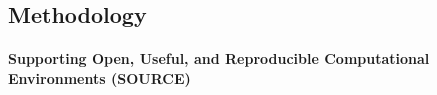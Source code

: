 \clearpage
\subsection{Methodology}\label{sec:concept_methodology}

%
%
%
%

\paragraph*{Supporting Open, Useful, and Reproducible Computational
  Environments (SOURCE)}\label{sec:SOURCE}

  \mbox{}\\

